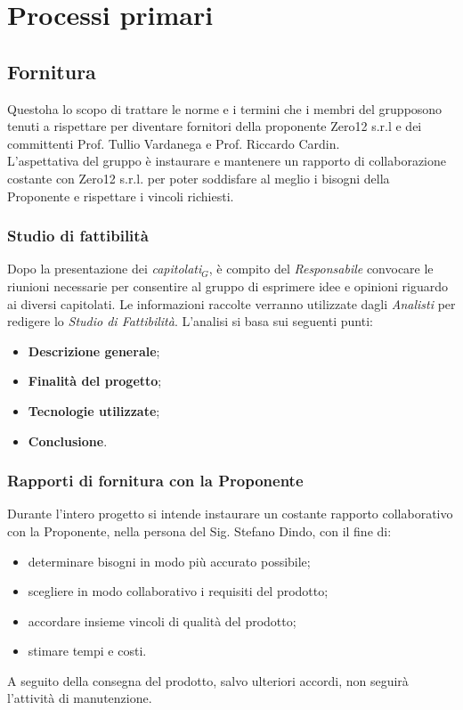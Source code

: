 \chapter{Processi primari}\label{Pp}
\section{Fornitura}			
Questoha lo scopo di trattare le norme e i termini che i membri del grupposono tenuti a rispettare per diventare fornitori della proponente Zero12 s.r.l e dei committenti Prof. Tullio Vardanega e Prof. Riccardo Cardin. \\
L'aspettativa del gruppo è instaurare e mantenere un rapporto di collaborazione costante con Zero12 s.r.l. per poter soddisfare al meglio i bisogni della Proponente e rispettare i vincoli richiesti.
\subsection{Studio di fattibilità} 
Dopo la presentazione dei \textit{capitolati$_{G}$}, è compito del \textit{Responsabile} convocare le riunioni necessarie per consentire al gruppo di esprimere idee e opinioni riguardo ai diversi capitolati. Le informazioni raccolte verranno utilizzate dagli \textit{Analisti} per redigere lo \textit{Studio di Fattibilità}. L'analisi si basa sui seguenti punti:
\begin{itemize}
	\item \textbf{Descrizione generale};
	\item \textbf{Finalità del progetto};
	\item \textbf{Tecnologie utilizzate};
	\item \textbf{Conclusione}.
\end{itemize}
\subsection{Rapporti di fornitura con la Proponente}
Durante l'intero progetto si intende instaurare un costante rapporto collaborativo con la Proponente, nella persona del Sig. Stefano Dindo, con il fine di:
\begin{itemize}
	\item determinare bisogni in modo più accurato possibile;
	\item scegliere in modo collaborativo i requisiti del prodotto;
	\item accordare insieme vincoli di qualità del prodotto;
	\item stimare tempi e costi.
\end{itemize}
A seguito della consegna del prodotto, salvo ulteriori accordi, non seguirà l'attività di manutenzione.
